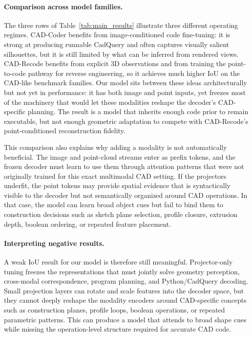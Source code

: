 \documentclass{article}
\begin{document}
\paragraph{Comparison across model families.}
The three rows of Table~\ref{tab:main_results} illustrate three different operating regimes. CAD-Coder benefits from image-conditioned code fine-tuning: it is strong at producing runnable CadQuery and often captures visually salient silhouettes, but it is still limited by what can be inferred from rendered views. CAD-Recode benefits from explicit 3D observations and from training the point-to-code pathway for reverse engineering, so it achieves much higher IoU on the CAD-like benchmark families. Our model sits between these ideas architecturally but not yet in performance: it has both image and point inputs, yet freezes most of the machinery that would let these modalities reshape the decoder's CAD-specific planning. The result is a model that inherits enough code prior to remain executable, but not enough geometric adaptation to compete with CAD-Recode's point-conditioned reconstruction fidelity.

This comparison also explains why adding a modality is not automatically beneficial. The image and point-cloud streams enter as prefix tokens, and the frozen decoder must learn to use them through attention patterns that were not originally trained for this exact multimodal CAD setting. If the projectors underfit, the point tokens may provide spatial evidence that is syntactically visible to the decoder but not semantically organized around CAD operations. In that case, the model can learn broad object cues but fail to bind them to construction decisions such as sketch plane selection, profile closure, extrusion depth, boolean ordering, or repeated feature placement.

\paragraph{Interpreting negative results.}
A weak IoU result for our model is therefore still meaningful. Projector-only tuning freezes the representations that must jointly solve geometry perception, cross-modal correspondence, program planning, and Python/CadQuery decoding. Small projection layers can rotate and scale features into the decoder space, but they cannot deeply reshape the modality encoders around CAD-specific concepts such as construction planes, profile loops, boolean operations, or repeated parametric patterns. This can produce a model that attends to broad shape cues while missing the operation-level structure required for accurate CAD code.
\end{document}
